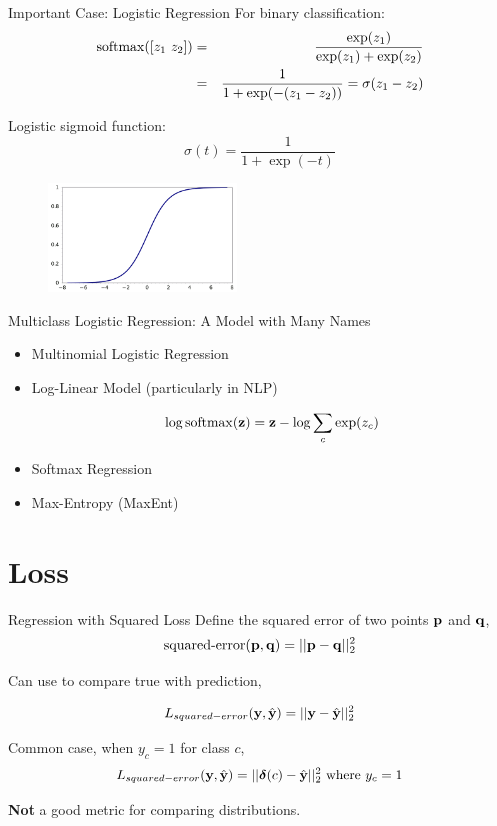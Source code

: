 \documentclass{beamer}
\begin{document}
\begin{frame}{Important Case: Logistic Regression}
  For binary classification:
  \begin{eqnarray*}
   \softmax([z_1\ z_2]) &=& \frac{\exp(z_1)}{\exp(z_1) + \exp(z_2)} \\
 &=& \frac{1}{1 + \exp(-(z_1-z_2))} = \sigma(z_1 -z_2)
  \end{eqnarray*}

  Logistic sigmoid function:
  \[\sigma(t) = \frac{1}{1 + \exp(-t)} \]
  \begin{figure}
    \centering
    \includegraphics[width=5cm]{sigmoid}
  \end{figure}
\end{frame}

\begin{frame}{Multiclass Logistic Regression: A Model with Many Names}
  \begin{itemize}
  \item  Multinomial Logistic Regression


  \item Log-Linear Model (particularly in NLP)

    \[\log \softmax(\boldz) = \boldz - \log \sum_{c} \exp(z_c)  \]


  \item Softmax Regression


  \item Max-Entropy (MaxEnt)


  \end{itemize}
\end{frame}

\section{Loss}

\begin{frame}{Regression with Squared Loss }
  Define the squared error of two points $\mathbf{p}$ and $\mathbf{q}$,
  \[ \textrm{squared-error}(\mathbf{p}, \mathbf{q})= ||\mathbf{p} - \mathbf{q}||^2_2  \]

  Can use to compare true with prediction,

  \[L_{squared-error}(\mathbf{y}, \hat{\mathbf{y}}) = ||\mathbf{y} - \hat{\mathbf{y}}||^2_2 \]

  Common case, when $y_c = 1$ for class $c$,
  \[L_{squared-error}(\mathbf{y}, \hat{\mathbf{y}}) = ||\boldsymbol{\delta}(c) - \hat{\mathbf{y}} ||_2^2  \mathrm{\ where\ }y_c = 1 \]

  \textbf{Not} a good metric for comparing distributions.
\end{frame}
\end{document}
